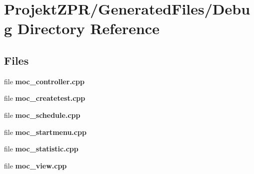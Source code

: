 \section{Projekt\-Z\-P\-R/\-Generated\-Files/\-Debug Directory Reference}
\label{dir_ac1f28d6ff5f4ce2eeeb32b497b4ee62}
\subsection*{Files}
\begin{DoxyCompactItemize}
\item 
file {\bf moc\-\_\-controller.\-cpp}
\item 
file {\bf moc\-\_\-createtest.\-cpp}
\item 
file {\bf moc\-\_\-schedule.\-cpp}
\item 
file {\bf moc\-\_\-startmenu.\-cpp}
\item 
file {\bf moc\-\_\-statistic.\-cpp}
\item 
file {\bf moc\-\_\-view.\-cpp}
\end{DoxyCompactItemize}
